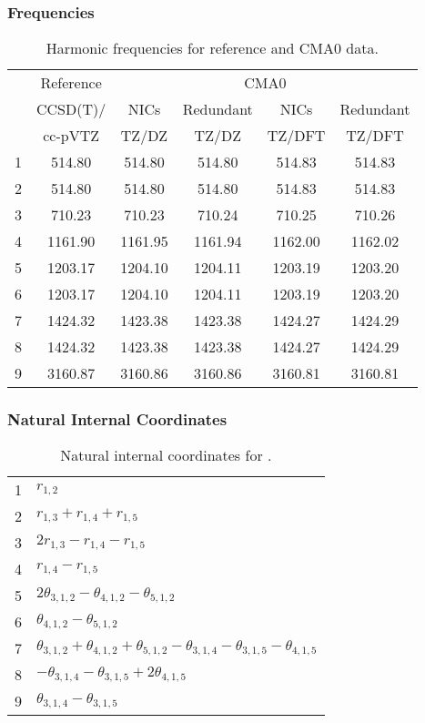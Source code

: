 \documentclass[10pt,oneside]{article}
\begin{document}
\begin{table}[h!]
\subsubsection*{Frequencies}
\centering
\caption{Harmonic frequencies for reference and CMA0 data.}
\begin{tabular}{cccccc}
\toprule
{} & Reference & \multicolumn{4}{c}{CMA0} \\
{} &  CCSD(T)/ &    NICs &  Redundant &    NICs & Redundant \\
{} &   cc-pVTZ &   TZ/DZ &      TZ/DZ &  TZ/DFT &    TZ/DFT \\
\midrule
1 &    514.80 &  514.80 &     514.80 &  514.83 &    514.83 \\
2 &    514.80 &  514.80 &     514.80 &  514.83 &    514.83 \\
3 &    710.23 &  710.23 &     710.24 &  710.25 &    710.26 \\
4 &   1161.90 & 1161.95 &    1161.94 & 1162.00 &   1162.02 \\
5 &   1203.17 & 1204.10 &    1204.11 & 1203.19 &   1203.20 \\
6 &   1203.17 & 1204.10 &    1204.11 & 1203.19 &   1203.20 \\
7 &   1424.32 & 1423.38 &    1423.38 & 1424.27 &   1424.29 \\
8 &   1424.32 & 1423.38 &    1423.38 & 1424.27 &   1424.29 \\
9 &   3160.87 & 3160.86 &    3160.86 & 3160.81 &   3160.81 \\
\bottomrule
\end{tabular}
\end{table}

\begin{table}[h!]
\subsubsection*{Natural Internal Coordinates}
\centering
\caption{Natural internal coordinates for .}
\small
\begin{tabular}{ll}
\toprule
  1   & $r_{1,2}$ \\
  2   & $r_{1,3} + r_{1,4} + r_{1,5}$ \\
  3   & $2r_{1,3} - r_{1,4} - r_{1,5}$ \\
  4   & $r_{1,4} - r_{1,5}$ \\
  5   & $2\theta_{3,1,2} - \theta_{4,1,2} - \theta_{5,1,2}$ \\
  6   & $\theta_{4,1,2} - \theta_{5,1,2}$ \\
  7   & $\theta_{3,1,2} + \theta_{4,1,2} + \theta_{5,1,2} - \theta_{3,1,4} - \theta_{3,1,5} - \theta_{4,1,5}$ \\
  8   & $-\theta_{3,1,4} - \theta_{3,1,5} + 2\theta_{4,1,5}$ \\
  9   & $\theta_{3,1,4} - \theta_{3,1,5}$ \\
\bottomrule
\end{tabular}
\end{table}
\end{document}
